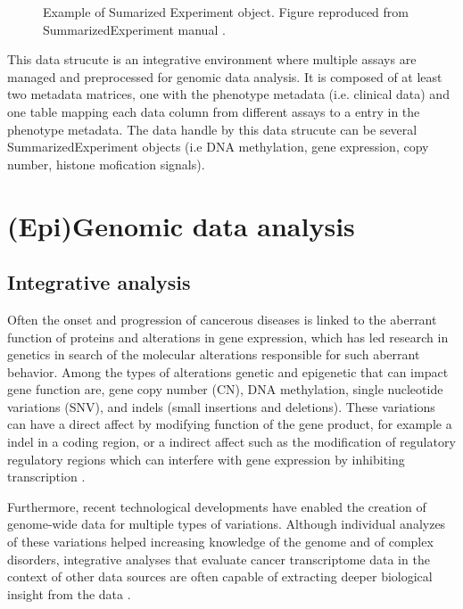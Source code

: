 \begin{description}
\begin{figure}[ht!]
  \caption[Sumarized Experiment object]{\label{fig:SE} Example of Sumarized Experiment object. Figure reproduced from SummarizedExperiment manual \cite{SummarizedExperiment}.}
  \end{figure}
  \item [\sigla{MAE}{MultiAssayExperiment}:] This data strucute is an integrative environment where multiple assays are managed and preprocessed for genomic data analysis.  It is composed of at least two metadata matrices, one with the phenotype metadata (i.e. clinical data) and one table mapping each data column from different assays to a entry in the phenotype metadata. The data handle by this data strucute can be several SummarizedExperiment objects (i.e DNA methylation, gene expression, copy number, histone mofication signals).

\end{description}





\section{(Epi)Genomic data analysis} \label{sec:concept-analysis}

\subsection{Integrative analysis}
Often the onset and progression of cancerous diseases is linked to the aberrant function of proteins and alterations in gene expression, which has led research in genetics in search of the molecular alterations responsible for such aberrant behavior.
Among the types of alterations genetic and epigenetic
that can impact gene function are, gene copy number
(CN), DNA methylation, single nucleotide variations (SNV), and indels (small insertions and
deletions).
These variations can have a direct affect by modifying
 function of the gene product, for example a
indel in a coding region, or a indirect affect such as
the modification of regulatory regulatory regions
 which can interfere
 with gene expression by inhibiting transcription \cite{thingholm2016strategies}.

Furthermore, recent technological developments have enabled the creation of genome-wide data for multiple types of variations.
Although individual analyzes of these variations helped  increasing knowledge of the genome and of complex
disorders, integrative analyses that evaluate cancer transcriptome data in the context of other data sources are often capable of extracting deeper biological insight from the data \cite{rhodes2005integrative}.

